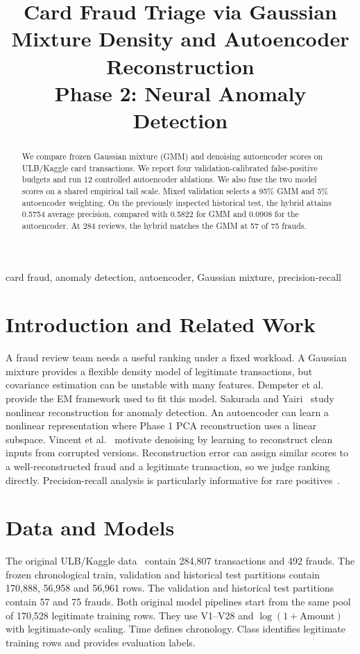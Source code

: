 \documentclass[conference]{IEEEtran}
\title{Card Fraud Triage via Gaussian Mixture Density and Autoencoder Reconstruction\\Phase 2: Neural Anomaly Detection}
\author{\IEEEauthorblockN{Team T085}\IEEEauthorblockA{Section E, Project 26\\Rishihood University}}
\begin{document}
\maketitle

\begin{abstract}
We compare frozen Gaussian mixture (GMM) and denoising autoencoder scores on ULB/Kaggle card transactions. We report four validation-calibrated false-positive budgets and run 12 controlled autoencoder ablations. We also fuse the two model scores on a shared empirical tail scale. Mixed validation selects a 95\% GMM and 5\% autoencoder weighting. On the previously inspected historical test, the hybrid attains 0.5754 average precision, compared with 0.5822 for GMM and 0.0908 for the autoencoder. At 284 reviews, the hybrid matches the GMM at 57 of 75 frauds.
\end{abstract}
\begin{IEEEkeywords}
card fraud, anomaly detection, autoencoder, Gaussian mixture, precision-recall
\end{IEEEkeywords}

\section{Introduction and Related Work}
A fraud review team needs a useful ranking under a fixed workload. A Gaussian mixture provides a flexible density model of legitimate transactions, but covariance estimation can be unstable with many features. Dempster et al.~\cite{dempster} provide the EM framework used to fit this model. Sakurada and Yairi~\cite{sakurada} study nonlinear reconstruction for anomaly detection. An autoencoder can learn a nonlinear representation where Phase 1 PCA reconstruction uses a linear subspace. Vincent et al.~\cite{vincent} motivate denoising by learning to reconstruct clean inputs from corrupted versions. Reconstruction error can assign similar scores to a well-reconstructed fraud and a legitimate transaction, so we judge ranking directly. Precision-recall analysis is particularly informative for rare positives~\cite{saito}.

\section{Data and Models}
The original ULB/Kaggle data~\cite{ulb} contain 284,807 transactions and 492 frauds. The frozen chronological train, validation and historical test partitions contain 170,888, 56,958 and 56,961 rows. The validation and historical test partitions contain 57 and 75 frauds. Both original model pipelines start from the same pool of 170,528 legitimate training rows. They use V1--V28 and $\log(1+\mathrm{Amount})$ with legitimate-only scaling. Time defines chronology. Class identifies legitimate training rows and provides evaluation labels.
\end{document}
